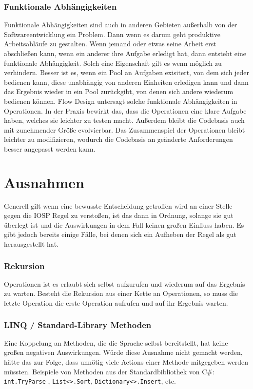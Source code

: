 \subsubsection{Funktionale Abhängigkeiten}

Funktionale Abhängigkeiten sind auch in anderen Gebieten außerhalb von der
Softwareentwicklung ein Problem. Dann wenn es darum geht produktive
Arbeitsabläufe zu gestalten.
Wenn jemand oder etwas seine Arbeit erst abschließen kann, wenn ein anderer
ihre Aufgabe erledigt hat, dann entsteht eine funktionale Abhängigkeit.
Solch eine Eigenschaft gilt es wenn möglich zu verhindern.
Besser ist es, wenn ein Pool an Aufgaben exisitert, von dem sich jeder bedienen kann,
diese unabhängig von anderen Einheiten erledigen kann und dann das Ergebnis wieder
in ein Pool zurückgibt, von denen sich andere wiederum bedienen können.
Flow Design untersagt solche funktionale Abhängigkeiten in Operationen.
In der Praxis bewirkt das, dass die Operationen eine klare Aufgabe haben, welches
sie leichter zu testen macht.
Außerdem bleibt die Codebasis auch mit zunehmender Größe evolvierbar. Das
Zusammenspiel der Operationen bleibt leichter zu modifizieren, wodurch die
Codebasis an geänderte Anforderungen besser angepasst werden kann.

\section{Ausnahmen}

Generell gilt  wenn eine bewusste Entscheidung getroffen wird an einer Stelle gegen die IOSP
Regel zu verstoßen, ist das dann in Ordnung, solange sie gut überlegt ist und
die Auswirkungen in dem Fall keinen großen Einfluss haben.
Es gibt jedoch bereits einige Fälle, bei denen sich ein Aufheben der Regel als gut
herausgestellt hat.
\subsubsection{Rekursion}

Operationen ist es erlaubt sich selbst aufzurufen und wiederum auf das Ergebnis
zu warten. Besteht die Rekursion aus einer Kette an Operationen, so muss die letzte
Operation die erste Operation aufrufen und auf ihr Ergebnis warten.
\subsubsection{LINQ / Standard-Library Methoden}

Eine Koppelung an Methoden, die die Sprache selbst bereitstellt, hat keine
großen negativen Auswirkungen. Würde diese Ausnahme nicht gemacht werden, hätte
das zur Folge, dass unnötig viele Actions einer Methode mitgegeben werden
müssten. Beispiele von Methoden aus der Standardbibliothek von C\#:
\texttt{int.TryParse} , \texttt{List<>.Sort}, \texttt{Dictionary<>.Insert}, etc.

